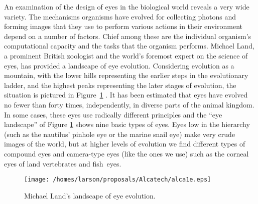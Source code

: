 \documentclass[10pt,twocolumn]{article}
\begin{document}
An examination of the design of eyes in the biological world reveals a
very wide variety. The mechanisms organisms have evolved for
collecting photons and forming images that they use to perform various
actions in their environment depend on a number of factors. Chief
among these are the individual organism's computational capacity and
the tasks that the organism performs. Michael Land, a prominent
British zoologist and the world's foremost expert on the science of
eyes, has provided a landscape of eye evolution. Considering evolution
as a mountain, with the lower hills representing the earlier steps in
the evolutionary ladder, and the highest peaks representing the later
stages of evolution, the situation is pictured in
Figure~\ref{mountimprob} \cite{dawkins}.  It has been estimated that
eyes have evolved no fewer than forty times, independently, in diverse
parts of the animal kingdom. In some cases, these eyes use radically
different principles and the ``eye landscape'' of Figure
\ref{mountimprob} shows nine basic types of eyes. Eyes low in the
hierarchy (such as the nautilus' pinhole eye or the marine snail eye)
make very crude images of the world, but at higher levels of evolution
we find different types of compound eyes and camera-type eyes (like
the ones we use) such as the corneal eyes of land vertebrates and
fish~eyes.

\begin{figure}[htbp]
  \centering\texttt{[image: /homes/larson/proposals/Alcatech/alca1e.eps]}
  \caption{Michael Land's landscape of eye evolution.}
  \label{mountimprob}
\end{figure}
\end{document}
